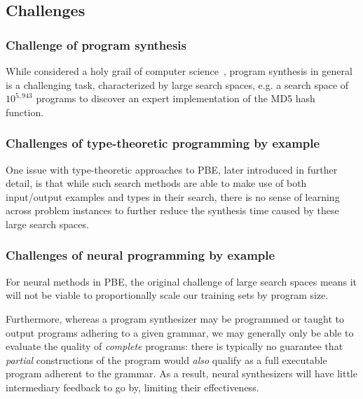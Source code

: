\documentclass{article}
\begin{document}
\subsection{Challenges}

\subsubsection{Challenge of program synthesis}

While considered a holy grail of computer science~\citep{gulwani2017program},
program synthesis in general is a challenging task, characterized by large search spaces,
e.g. a search space of $10^{5,943}$ programs to discover an expert implementation of the MD5 hash function.~\cite{gulwani2017program}

\subsubsection{Challenges of type-theoretic programming by example} \label{sec:typepbe}

One issue with type-theoretic approaches to PBE, later introduced in further detail,
is that while such search methods are able to make use of both input/output examples and types in their search,
there is no sense of learning across problem instances to further reduce the synthesis time caused by these large search spaces.

\subsubsection{Challenges of neural programming by example} \label{sec:challengesnps}

For neural methods in PBE, the original challenge of large search spaces means
it will not be viable to proportionally scale our training sets by program size.

Furthermore, whereas a program synthesizer may be programmed or taught to output programs adhering to a given grammar,
we may generally only be able to evaluate the quality of \emph{complete} programs:
there is typically no guarantee that \emph{partial} constructions of the program would \emph{also} qualify as a full executable program adherent to the grammar.
As a result, neural synthesizers will have little intermediary feedback to go by, limiting their effectiveness.
\end{document}
